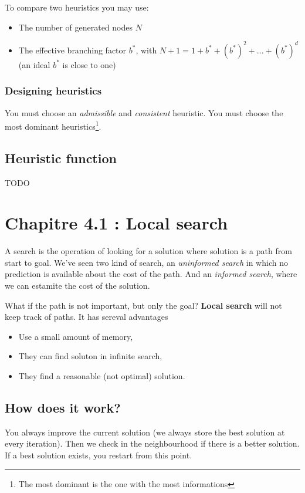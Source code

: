 To compare two heuristics you may use:
\begin{itemize}
\item The number of generated nodes $N$
\item The effective branching factor $b^*$, with $N+1 = 1 + b^* + (b^*)^2 + ... + (b^*)^d$ (an ideal $b^*$ is close to one)
\end{itemize}

\subsubsection{Designing heuristics}

You must choose an \textit{admissible} and \textit{consistent} heuristic. You must choose the most dominant heuristics\footnote{The most dominant is the one with the most informations}. 


\subsection{Heuristic function}
TODO


\section{Chapitre 4.1 : Local search}

A search is the operation of looking for a solution where solution is a path from start to goal. We've seen two kind of search, an \textit{uninformed search} in which no prediction is available about the cost of the path. And an \textit{informed search}, where we can estamite the cost of the solution.

What if the path is not important, but only the goal? \textbf{Local search} will not keep track of paths. It has sereval advantages
\begin{itemize}
\item Use a small amount of memory,
\item They can find soluton in infinite search,
\item They find a reasonable (not optimal) solution.
\end{itemize}

\subsection{How does it work?}

You always improve the current solution (we always store the best solution at every iteration). Then we check in the neighbourhood if there is a better solution. If a best solution exists, you restart from this point.

